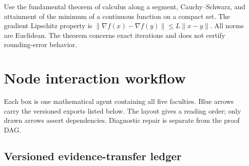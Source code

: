 \documentclass[preprint,12pt,aps,pra,showkeys,amsmath,amssymb,superscriptaddress,floatfix]{revtex4-2}
\theoremstyle{definition}
\theoremstyle{remark}
\begin{document}
Use the fundamental theorem of calculus along a segment,
Cauchy--Schwarz, and attainment of the minimum of a continuous function
on a compact set. The gradient Lipschitz property is
\(\|\nabla f(x)-\nabla f(y)\|\le L\|x-y\|\). All norms are Euclidean.
The theorem concerns exact iterations and does not certify
rounding-error behavior.

\clearpage\section{Node interaction workflow}

\begin{center}\end{center}

Each box is one mathematical agent containing all five faculties. Blue
arrows carry the versioned exports listed below. The layout gives a
reading order; only drawn arrows assert dependencies. Diagnostic repair
is separate from the proof DAG.

\subsection{Versioned evidence-transfer ledger}
\end{document}
